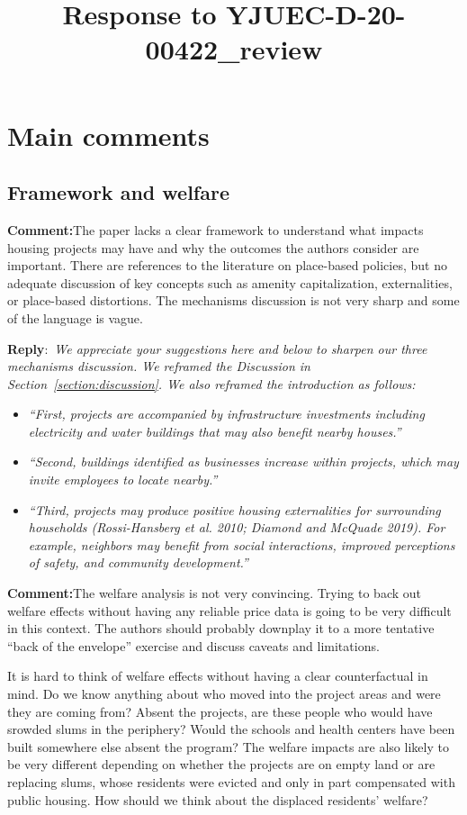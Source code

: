 \documentclass{article}
\title{Response to YJUEC-D-20-00422\_review}
\author{}
\newcommand{\reply}{\medskip \noindent \textbf{Reply}:\ \textit }
\newcommand{\sr}{\begin{minipage}{\dimexpr\textwidth-3cm}}
\newcommand{\er}{\end{minipage}}
\newcommand{\cc}{\medskip \noindent \textbf{Comment:}\hspace{2em}}
\begin{document}
\maketitle

\noindent

\section{Main comments}

\subsection{Framework and welfare}

\cc The paper lacks a clear framework to understand what impacts housing projects may have and why the outcomes the authors consider are important. There are references to the literature on place-based policies, but no adequate discussion of key concepts such as amenity capitalization, externalities, or place-based distortions. The mechanisms discussion is not very sharp and some of the language is vague.
\sr
\reply{We appreciate your suggestions here and below to sharpen our three mechanisms discussion.  We reframed the Discussion in Section~\ref{section:discussion}.  We also reframed the introduction as follows:}
\begin{itemize}
\item \textit{``First, projects are accompanied by infrastructure investments including electricity and water buildings that may also benefit nearby houses.'' }
\item \textit{ ``Second, buildings identified as businesses increase within projects, which may invite employees to locate nearby.'' }
\item \textit{ ``Third, projects may produce positive housing externalities for surrounding households (Rossi-Hansberg et al. 2010; Diamond and McQuade 2019).  For example, neighbors may benefit from social interactions, improved perceptions of safety, and community development.''}
\end{itemize}
\er

\cc The welfare analysis is not very convincing. Trying to back out welfare effects without having any reliable price data is going to be very difficult in this context. The authors should probably downplay it to a more tentative “back of the envelope” exercise and discuss caveats and limitations.

It is hard to think of welfare effects without having a clear counterfactual in mind. Do we know anything about who moved into the project areas and were they are coming from? Absent the projects, are these people who would have srowded slums in the periphery? Would the schools and health centers have been built somewhere else absent the program? The welfare impacts are also likely to be very different depending on whether the projects are on empty land or are replacing slums, whose residents were evicted and only in part compensated with public housing. How should we think about the displaced residents’ welfare?
\end{document}

